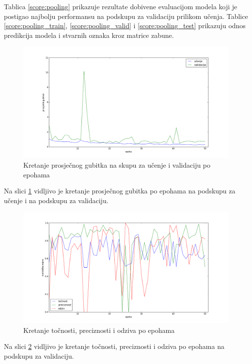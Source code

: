 \documentclass[times, utf8, diplomski, numeric]{fer}
\begin{document}
\noindent Tablica \ref{score:pooling} prikazuje rezultate dobivene evaluacijom modela koji je postigao najbolju performansu na podskupu za validaciju prilikom učenja.
Tablice \ref{score:pooling_train}, \ref{score:pooling_valid} i \ref{score:pooling_test} prikazuju odnos predikcija modela i stvarnih oznaka kroz matrice zabune.

\begin{figure}[H]
\centering
\includegraphics[scale=0.35]{images/pooling_loss.png}
\caption{Kretanje prosječnog gubitka na skupu za učenje i validaciju po epohama}
\label{img:pooling_loss}
\end{figure}
\noindent Na slici \ref{img:pooling_loss} vidljivo je kretanje prosječnog gubitka po epohama na podskupu za učenje i na podskupu za validaciju.

\begin{figure}[H]
\centering
\includegraphics[scale=0.35]{images/pooling_ac_ap.png}
\caption{Kretanje točnosti, preciznosti i odziva po epohama}
\label{img:pooling_ac_ap}
\end{figure}
\noindent Na slici \ref{img:pooling_ac_ap} vidljivo je kretanje točnosti, preciznosti i odziva po epohama na podskupu za validaciju.
\end{document}
